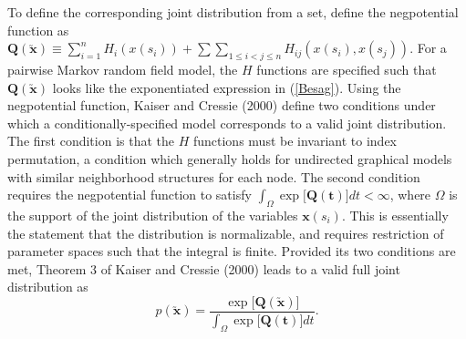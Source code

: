 \documentclass[12pt, a4paper, twoside]{article}
\begin{document}
To define the corresponding joint distribution from a set, define the negpotential function as $\mathbf{Q(\boldsymbol{\utilde{x}})}\equiv \sum_{i=1}^{n}H_i(x(s_i)) + \sum\sum_{1\leq i < j \leq n} H_{ij}(x(s_i),x(s_j))$. For a pairwise Markov random field model, the $H$ functions are specified such that $\mathbf{Q(\boldsymbol{\utilde{x}})}$ looks like the exponentiated expression in (\ref{Besag}). Using the negpotential function, Kaiser and Cressie (2000) define two conditions under which a conditionally-specified model corresponds to a valid joint distribution. The first condition is that the $H$ functions must be invariant to index permutation, a condition which generally holds for undirected graphical models with similar neighborhood structures for each node. The second condition requires the negpotential function to satisfy $\int_{\Omega}\exp\lbrack\mathbf{Q(t)}\rbrack dt < \infty$, where $\Omega$ is the support of the joint distribution of the variables $\boldsymbol{x}(s_i)$. This is essentially the statement that the distribution is normalizable, and requires restriction of parameter spaces such that the integral is finite. Provided its two conditions are met, Theorem 3 of Kaiser and Cressie (2000) leads to a valid full joint distribution as
\begin{equation*}
p(\boldsymbol{\utilde{x}}) = \frac{\exp\lbrack\mathbf{Q(\boldsymbol{\utilde{x}})}\rbrack}
{\int_\Omega \exp\lbrack\mathbf{Q(t)}\rbrack dt} \boldsymbol{.}
\end{equation*}
\end{document}
